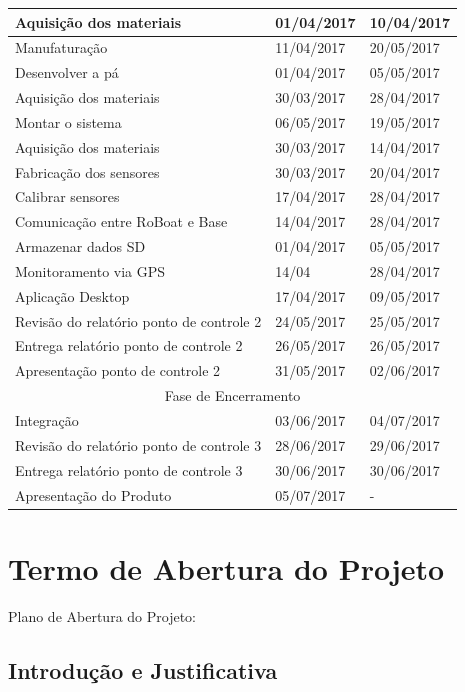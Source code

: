 \begin{table}[]
\begin{tabular}{|l|l|l|}
Aquisição dos materiais & 01/04/2017 & 10/04/2017 \\ \hline
Manufaturação & 11/04/2017 & 20/05/2017 \\ \hline
Desenvolver a pá & 01/04/2017 & 05/05/2017 \\ \hline
Aquisição dos materiais & 30/03/2017 & 28/04/2017 \\ \hline
Montar o sistema & 06/05/2017 & 19/05/2017  \\ \hline
Aquisição dos materiais & 30/03/2017 & 14/04/2017 \\ \hline
Fabricação dos sensores & 30/03/2017 & 20/04/2017 \\ \hline
Calibrar sensores & 17/04/2017 & 28/04/2017 \\ \hline
Comunicação entre RoBoat e Base & 14/04/2017 & 28/04/2017 \\ \hline
Armazenar dados SD & 01/04/2017 & 05/05/2017 \\ \hline
Monitoramento via GPS & 14/04 & 28/04/2017 \\ \hline
Aplicação Desktop &  17/04/2017 & 09/05/2017 \\ \hline
Revisão do relatório ponto de controle 2 & 24/05/2017 & 25/05/2017 \\ \hline
Entrega relatório ponto de controle 2 & 26/05/2017 & 26/05/2017 \\ \hline
Apresentação ponto de controle 2 & 31/05/2017 & 02/06/2017 \\ \hline
\multicolumn{3}{|c|}{Fase de Encerramento} \\ \hline
Integração & 03/06/2017 & 04/07/2017 \\ \hline
Revisão do relatório ponto de controle 3 & 28/06/2017 & 29/06/2017 \\ \hline
Entrega relatório ponto de controle 3 & 30/06/2017 & 30/06/2017 \\ \hline
Apresentação do Produto & 05/07/2017 & - \\ \hline
\end{tabular}
\end{table}
\FloatBarrier
\section{Termo de Abertura do Projeto}

Plano de Abertura do Projeto:

\subsection{Introdução e Justificativa}

